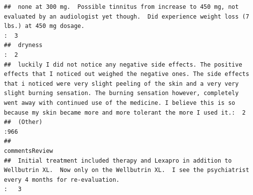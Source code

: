 \documentclass[spanish,]{article}
\begin{document}
\begin{verbatim}
##  none at 300 mg.  Possible tinnitus from increase to 450 mg, not evaluated by an audiologist yet though.  Did experience weight loss (7 lbs.) at 450 mg dosage.                                                                                                                                                                                                                                                      :  3    
##  dryness                                                                                                                                                                                                                                                                                                                                                                                                             :  2    
##  luckily I did not notice any negative side effects. The positive effects that I noticed out weighed the negative ones. The side effects that i noticed were very slight peeling of the skin and a very very slight burning sensation. The burning sensation however, completely went away with continued use of the medicine. I believe this is so because my skin became more and more tolerant the more I used it.:  2    
##  (Other)                                                                                                                                                                                                                                                                                                                                                                                                             :966    
##                                                                                                                                                                                                                                                                                                                                                                                                                                                                                                                       commentsReview
##  Initial treatment included therapy and Lexapro in addition to Wellbutrin XL.  Now only on the Wellbutrin XL.  I see the psychiatrist every 4 months for re-evaluation.                                                                                                                                                                                                                                                                                                                                                      :   3  

\end{verbatim}
\end{document}

